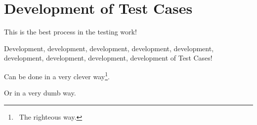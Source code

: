 \section{Development of Test Cases}
\label{sec:Development of Test Cases}

This is the best process in the testing work! 

Development, development, development, development, development, development, development, development, development of Test Cases!

Can be done in a very clever way\footnote{~The righteous way.}.

Or in a very dumb way.
